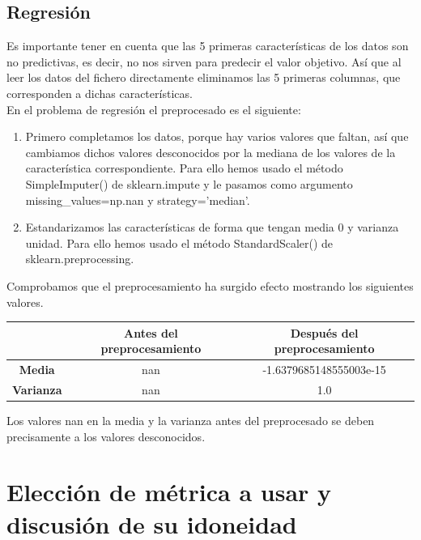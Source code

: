 \documentclass[12pt]{article}
\begin{document}
\subsection{Regresión}

Es importante tener en cuenta que las 5 primeras características de los datos son no predictivas, es decir, no nos sirven para predecir el valor objetivo. Así que al leer los datos del fichero directamente eliminamos las 5 primeras columnas, que corresponden a dichas características.\\

En el problema de regresión el preprocesado es el siguiente:
\begin{enumerate}
	\item Primero completamos los datos, porque hay varios valores que faltan, así que cambiamos dichos valores desconocidos por la mediana de los valores de la característica correspondiente. Para ello hemos usado el método SimpleImputer() de sklearn.impute y le pasamos como argumento missing\_values=np.nan y strategy='median'.
	\item Estandarizamos las características de forma que tengan media 0 y varianza unidad. Para ello hemos usado el método StandardScaler() de sklearn.preprocessing.
\end{enumerate}

Comprobamos que el preprocesamiento ha surgido efecto mostrando los siguientes valores.

\begin{table}[H]
\begin{tabular}{c|c|c|}
\cline{2-3}
                                                  & \textbf{Antes del preprocesamiento} & \textbf{Después del preprocesamiento} \\ \hline
\multicolumn{1}{|c|}{\textbf{Media}}              & nan                  & -1.6379685148555003e-15               \\ \hline
\multicolumn{1}{|c|}{\textbf{Varianza}}           & nan                   & 1.0                    \\ \hline
\end{tabular}
\end{table}

Los valores nan en la media y la varianza antes del preprocesado se deben precisamente a los valores desconocidos.

\section{Elección de métrica a usar y discusión de su idoneidad}
\end{document}
